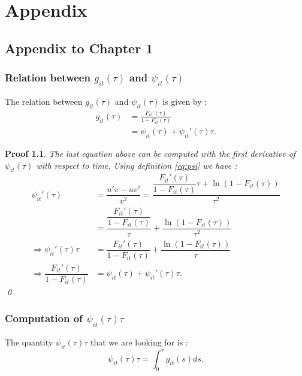 \appendix

\chapter{Appendix}

\section{Appendix to Chapter 1}
\subsection{Relation between $g_{it}(\tau)$ and $\psi_{it}(\tau)$}

The relation between $g_{it}(\tau)$ and $\psi_{it}(\tau)$  is given by :
\begin{align} \label{gphi}
    g_{it}(\tau) &= \frac{F_{it}'(\tau)}{1-F_{it}(\tau)} \nonumber \\
    &= \psi_{it}(\tau) + \psi_{it}'(\tau)\tau.
\end{align}

\newtheorem*{proof1}{Proof}
\begin{proof1}
The last equation above can be computed with the first derivative of $\psi_{it}(\tau)$ with respect to time. Using definition \ref{eq:psi} we have :
\begin{align*}
\psi_{it}'(\tau) &= \dfrac{u' v - u v'}{v^2} = \dfrac{\dfrac{F_{it}'(\tau)}{1-F_{it}(\tau)}\tau + \ln(1-F_{it}(\tau))}{\tau^2} \\
&= \dfrac{\dfrac{F_{it}'(\tau)}{1-F_{it}(\tau)}}{\tau} + \dfrac{\ln(1-F_{it}(\tau))}{\tau^2}\\
\Rightarrow \psi_{it}'(\tau) \tau &= \dfrac{F_{it}'(\tau)}{1-F_{it}(\tau)} + \dfrac{\ln(1-F_{it}(\tau))}{\tau}\\
\Rightarrow \dfrac{F_{it}'(\tau)}{1-F_{it}(\tau)} &= \psi_{it}(\tau) + \psi_{it}'(\tau) \tau.
\end{align*} \qed
\end{proof1}

\subsection{Computation of $\psi_{it}(\tau) \tau$}

The quantity $\psi_{it}(\tau) \tau$ that we are looking for is :
\begin{equation}
    \psi_{it}(\tau) \tau = \int_0^{\tau}g_{it}(s) ds.
\end{equation}

